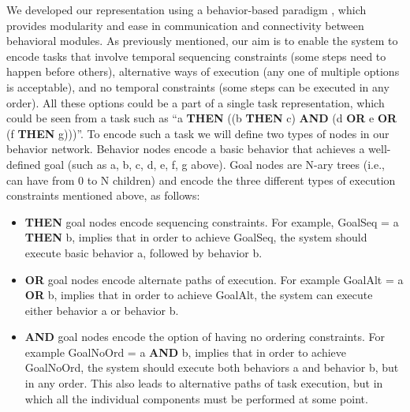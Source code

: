 \documentclass[conference]{article}
\begin{document}
We developed our representation using a behavior-based paradigm \cite{arkin1998behavior}, which provides modularity and ease in communication and connectivity between behavioral modules.  As previously mentioned, our aim is to enable the system to encode tasks that involve temporal sequencing constraints (some steps need to happen before others), alternative ways of execution (any one of multiple options is acceptable), and no temporal constraints (some steps can be executed in any order). All these options could be a part of a single task representation, which could be seen from a task such as ``a {\bf THEN} ((b {\bf THEN} c) {\bf AND} (d {\bf OR} e {\bf OR} (f {\bf THEN} g)))''. To encode such a task we will define two types of nodes in our behavior network. Behavior nodes encode a basic behavior that achieves a well-defined goal (such as a, b, c, d, e, f, g above). Goal nodes are N-ary trees (i.e., can have from 0 to N children) and encode the three different types of execution constraints mentioned above, as follows:
\begin{itemize}

\item {\bf THEN} goal nodes encode sequencing constraints. For example, GoalSeq = a {\bf THEN} b, implies that in order to achieve GoalSeq, the system should execute basic behavior a, followed by behavior b.

\item {\bf OR} goal nodes encode alternate paths of execution. For example GoalAlt = a {\bf OR} b, implies that in order to achieve GoalAlt, the system can execute either behavior a or behavior b.

\item {\bf AND} goal nodes encode the option of having no ordering constraints. For example GoalNoOrd = a {\bf AND} b, implies that in order to achieve GoalNoOrd, the system should execute both behaviors a and behavior b, but in any order. This also leads to alternative paths of task execution, but in which all the individual components must be performed at some point.

\end{itemize}
\end{document}

